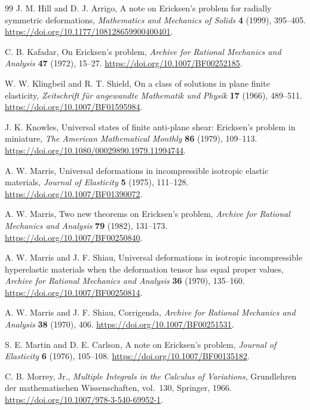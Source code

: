 \documentclass[11pt,a4paper]{article}
\numberwithin{equation}{section}
\theoremstyle{plain}
\theoremstyle{definition}
\theoremstyle{remark}
\begin{document}
\begin{thebibliography}{99}
J. M. Hill and D. J. Arrigo,
A note on Ericksen's problem for radially symmetric deformations,
\emph{Mathematics and Mechanics of Solids} \textbf{4} (1999), 395--405.
\url{https://doi.org/10.1177/108128659900400401}.

C. B. Kafadar, On Ericksen's problem,
\emph{Archive for Rational Mechanics and Analysis} \textbf{47}
(1972), 15--27.
\url{https://doi.org/10.1007/BF00252185}.

W. W. Klingbeil and R. T. Shield,
On a class of solutions in plane finite elasticity,
\emph{Zeitschrift f\"ur angewandte Mathematik und Physik} \textbf{17}
(1966), 489--511.
\url{https://doi.org/10.1007/BF01595984}.

J. K. Knowles,
Universal states of finite anti-plane shear: Ericksen's problem in miniature,
\emph{The American Mathematical Monthly} \textbf{86} (1979), 109--113.
\url{https://doi.org/10.1080/00029890.1979.11994744}.

A. W. Marris,
Universal deformations in incompressible isotropic elastic materials,
\emph{Journal of Elasticity} \textbf{5} (1975), 111--128.
\url{https://doi.org/10.1007/BF01390072}.

A. W. Marris, Two new theorems on Ericksen's problem,
\emph{Archive for Rational Mechanics and Analysis} \textbf{79}
(1982), 131--173.
\url{https://doi.org/10.1007/BF00250840}.

A. W. Marris and J. F. Shiau,
Universal deformations in isotropic incompressible hyperelastic materials
when the deformation tensor has equal proper values,
\emph{Archive for Rational Mechanics and Analysis} \textbf{36}
(1970), 135--160.
\url{https://doi.org/10.1007/BF00250814}.

A. W. Marris and J. F. Shiau,
Corrigenda, \emph{Archive for Rational Mechanics and Analysis}
\textbf{38} (1970), 406.
\url{https://doi.org/10.1007/BF00251531}.

S. E. Martin and D. E. Carlson, A note on Ericksen's problem,
\emph{Journal of Elasticity} \textbf{6} (1976), 105--108.
\url{https://doi.org/10.1007/BF00135182}.

C. B. Morrey, Jr., \emph{Multiple Integrals in the Calculus of Variations},
Grundlehren der mathematischen Wissenschaften, vol.~130, Springer, 1966.
\url{https://doi.org/10.1007/978-3-540-69952-1}.


\end{thebibliography}
\end{document}
